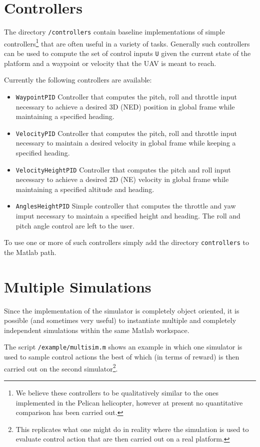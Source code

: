 \documentclass[a4paper,11pt]{report}
\begin{document}
\section{Controllers}

The directory \texttt{/controllers} contain baseline implementations of simple controllers\footnote{We believe these controllers to be qualitatively similar to the ones implemented in the Pelican helicopter, however at present no quantitative comparison has been carried out.} that are often useful in a variety of tasks. Generally such controllers can be used to compute the set of control inputs \texttt{U} given the current state of the platform and a waypoint or velocity that the UAV is meant to reach. 

Currently the following controllers are available:
\begin{itemize}
\item \texttt{WaypointPID} Controller that computes the pitch, roll and throttle input necessary to achieve a desired 3D (NED) position in global frame while maintaining a specified heading.
\item \texttt{VelocityPID} Controller that computes the pitch, roll and throttle input necessary to maintain a desired velocity in global frame while keeping a specified heading.
\item \texttt{VelocityHeightPID} Controller that computes the pitch and roll input necessary to achieve a desired 2D (NE) velocity in global frame while maintaining a specified altitude and heading.
\item \texttt{AnglesHeightPID} Simple controller that computes the throttle and yaw imput necessary to maintain a specified height and heading. The roll and pitch angle control are left to the user.
\end{itemize}

To use one or more of such controllers simply add the directory \texttt{controllers} to the Matlab path.

\section{Multiple Simulations}

Since the implementation of the simulator is completely object oriented, it is possible (and sometimes very useful) to instantiate multiple and completely independent simulations within the same Matlab workspace.  

The script \texttt{/example/multisim.m} shows an example in which one simulator is used to sample control actions the best of which (in terms of reward) is then carried out on the second simulator\footnote{This replicates what one might do in reality where the simulation is used to evaluate control action that are then carried out on a real platform.}. 
\end{document}

